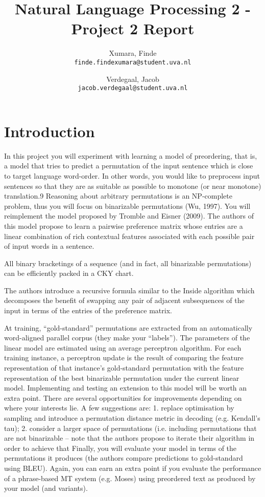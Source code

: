 \documentclass[11pt,DIV=11]{scrartcl}
\title{\small Natural Language Processing 2 - Project 2 Report \LARGE \\ \sc{\bf{Source Sentence Reordering for Better Translation}} }
\author{
    Xumara, Finde\\
    \texttt{finde.findexumara@student.uva.nl}
    \and
    Verdegaal, Jacob\\
    \texttt{jacob.verdegaal@student.uva.nl}
}
\begin{document}
\maketitle

\section{Introduction}

In this project you will experiment with learning a model of preordering, that is, a model that tries to predict a permutation of the input sentence which is close to target language word-order. In other words, you would like to preprocess input sentences so that they are as suitable as possible to monotone (or near monotone) translation.9 Reasoning about arbitrary permutations is an NP-complete problem, thus you will focus on binarizable permutations (Wu, 1997).
You will reimplement the model proposed by Tromble and Eisner (2009). The authors of this model propose to learn a pairwise preference matrix whose entries are a linear combination of rich contextual features associated with each possible pair of input words in a sentence. 

All binary bracketings of a sequence (and in fact, all binarizable permutations) can be efficiently packed in a CKY chart.

The authors introduce a recursive formula similar to the Inside algorithm which decomposes the benefit of swapping any pair of adjacent subsequences of the input in terms of the entries of the preference matrix. 

At training, “gold-standard” permutations are extracted from an automatically word-aligned parallel corpus (they make your “labels”). The parameters of the linear model are estimated using an average perceptron algorithm. For each training instance, a perceptron update is the result of comparing the feature representation of that instance’s gold-standard permutation with the feature representation of the best binarizable permutation under the current linear model.
Implementing and testing an extension to this model will be worth an extra point. There are several opportunities for improvements depending on where your interests lie. A few suggestions are:
1. replace optimisation by sampling and introduce a permutation distance metric in decoding (e.g. Kendall’s tau);
2. consider a larger space of permutations (i.e. including permutations that are not binarizable – note that the authors propose to iterate their algorithm in order to achieve that
Finally, you will evaluate your model in terms of the permutations it produces (the authors compare predictions to gold-standard using BLEU). Again, you can earn an extra point if you evaluate the performance of a phrase-based MT system (e.g. Moses) using preordered text as produced by your model (and variants).
\end{document}
